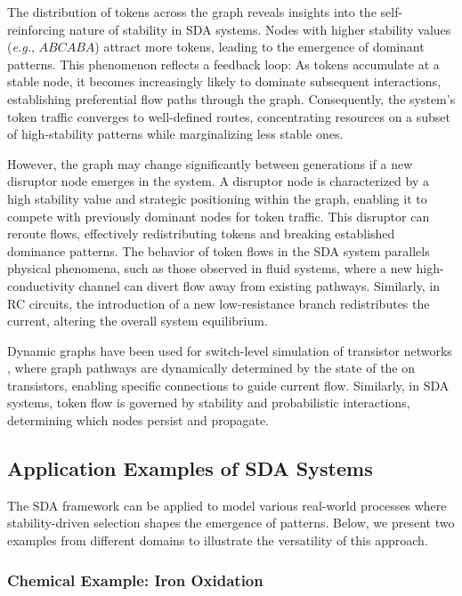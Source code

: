 \documentclass[preprint,12pt]{elsarticle}
\begin{document}
The distribution of tokens across the graph reveals insights into the self-reinforcing nature of stability in SDA systems. Nodes with higher stability values (\textit{e.g.}, $ABCABA$) attract more tokens, leading to the emergence of dominant patterns. This phenomenon reflects a feedback loop: As tokens accumulate at a stable node, it becomes increasingly likely to dominate subsequent interactions, establishing preferential flow paths through the graph. Consequently, the system's token traffic converges to well-defined routes, concentrating resources on a subset of high-stability patterns while marginalizing less stable ones.

However, the graph may change significantly between generations if a new disruptor node emerges in the system. A disruptor node is characterized by a high stability value and strategic positioning within the graph, enabling it to compete with previously dominant nodes for token traffic. This disruptor can reroute flows, effectively redistributing tokens and breaking established dominance patterns. The behavior of token flows in the SDA system parallels physical phenomena, such as those observed in fluid systems, where a new high-conductivity channel can divert flow away from existing pathways. Similarly, in RC circuits, the introduction of a new low-resistance branch redistributes the current, altering the overall system equilibrium. 

Dynamic graphs have been used for switch-level simulation of transistor networks \cite{AdlerCAD}, where graph pathways are dynamically determined by the state of the on transistors, enabling specific connections to guide current flow. Similarly, in SDA systems, token flow is governed by stability and probabilistic interactions, determining which nodes persist and propagate.

\subsection{Application Examples of SDA Systems}

The SDA framework can be applied to model various real-world processes where stability-driven selection shapes the emergence of patterns. Below, we present two examples from different domains to illustrate the versatility of this approach.

\subsubsection{Chemical Example: Iron Oxidation}
\end{document}
